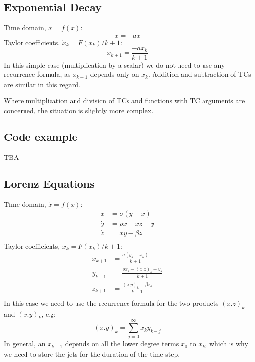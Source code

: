 \documentclass[11pt]{article}
\begin{document}
\subsection{Exponential Decay}
Time domain, $\dot{x} = f(x)$:
\begin{equation}
\dot{x} = - a x
\end{equation}
Taylor coefficients, $\dot{x}_k = F(x_k) / k + 1$:
\begin{equation}
x_{k+1} = \frac{- a x_k} {k + 1}
\end{equation}
In this simple case (multiplication by a scalar) we do not need to use any recurrence formula, as $x_{k+1}$ depends only on $x_k$.
Addition and subtraction of TCs are similar in this regard.

Where multiplication and division of TCs and functions with TC arguments are concerned, the situation is slightly more complex.
\subsection{Code example}
TBA
\subsection{Lorenz Equations}
Time domain, $\dot{x} = f(x)$:
\begin{equation}
\begin{aligned}
\dot{x} &= \sigma (y - x) \\
\dot{y} &= \rho x - xz - y \\
\dot{z} &= xy - \beta z \\
\end{aligned}
\end{equation}
Taylor coefficients, $\dot{x}_k = F(x_k) / k + 1$:
\begin{equation}
\begin{aligned}
x_{k+1} &= \frac{\sigma (y_k - x_k)}{k + 1} \\
y_{k+1} &= \frac{\rho x_k - (x.z)_k - y_k}{k + 1} \\
z_{k+1} &= \frac{(x.y)_k - \beta z_k}{k + 1} \\
\end{aligned}
\end{equation}
In this case we need to use the recurrence formula for the two products $(x.z)_k$ and $(x.y)_k$, e.g:
\begin{equation}
(x.y)_k = \sum_{j=0}^{\infty} x_k y_{k - j}
\end{equation}
In general, an $x_{k+1}$ depends on all the lower degree terms $x_0$ to $x_k$, which is why we need to store the jets for the duration of the time step.
\end{document}
